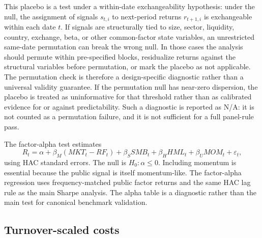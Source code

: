 \documentclass[12pt,a4paper]{article}
\begin{document}
This placebo is a test under a within-date exchangeability hypothesis:
under the null, the assignment of signals \(s_{t,i}\) to next-period
returns \(r_{t+1,i}\) is exchangeable within each date \(t\).  If signals
are structurally tied to size, sector, liquidity, country, exchange,
beta, or other common-factor state variables, an unrestricted same-date
permutation can break the wrong null.  In those cases the analysis should
permute within pre-specified blocks, residualize returns against the
structural variables before permutation, or mark the placebo as not
applicable.  The permutation check is therefore a design-specific
diagnostic rather than a universal validity guarantee.
If the permutation null has near-zero dispersion, the placebo is treated
as uninformative for that threshold rather than as calibrated evidence
for or against predictability.  Such a diagnostic is reported as N/A: it
is not counted as a permutation failure, and it is not sufficient for a
full panel-rule pass.

The factor-alpha test estimates
\begin{equation}
  R_t = \alpha + \beta_M(MKT_t-RF_t)+\beta_S SMB_t
  +\beta_H HML_t+\beta_U MOM_t+\varepsilon_t ,
  \label{eq:alpha}
\end{equation}
using HAC standard errors.  The null is \(H_0:\alpha\le0\).  Including
momentum is essential because the public signal is itself momentum-like.
The factor-alpha regression uses frequency-matched public factor returns
and the same HAC lag rule as the main Sharpe analysis.  The alpha table
is a diagnostic rather than the main test for canonical benchmark
validation.

\subsection{Turnover-scaled costs}
\end{document}

